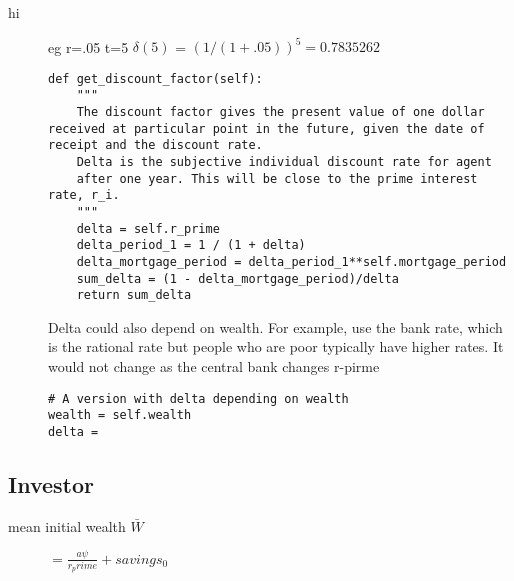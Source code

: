 \begin{description}
    \item[hi]

eg r=.05  t=5  $\delta(5)$ =  $(1/(1+.05))^5 = 0.7835262$


\begin{lstlisting}
def get_discount_factor(self):
    """
    The discount factor gives the present value of one dollar received at particular point in the future, given the date of receipt and the discount rate.
    Delta is the subjective individual discount rate for agent
    after one year. This will be close to the prime interest rate, r_i.
    """    
    delta = self.r_prime
    delta_period_1 = 1 / (1 + delta) 
    delta_mortgage_period = delta_period_1**self.mortgage_period
    sum_delta = (1 - delta_mortgage_period)/delta
    return sum_delta
\end{lstlisting}
Delta could also depend on wealth. For example,  use the bank rate, which is the rational rate but people who are poor typically have higher rates.  It would not change as the central bank changes r-pirme


\begin{lstlisting}
# A version with delta depending on wealth
wealth = self.wealth
delta =
\end{lstlisting}


\end{description}

\subsection{Investor}
\begin{description}
\item[mean initial wealth $\bar W$] $= \frac {a\psi}{r_prime}+savings_0$
\end{description}


